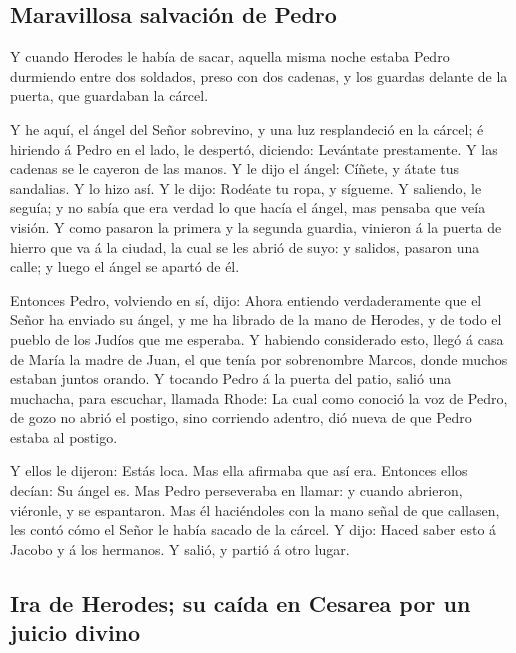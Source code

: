 \hypertarget{maravillosa-salvaciuxf3n-de-pedro}{%
\subsection{Maravillosa salvación de
Pedro}\label{maravillosa-salvaciuxf3n-de-pedro}}

 Y cuando Herodes le había de sacar, aquella misma noche
estaba Pedro durmiendo entre dos soldados, preso con dos cadenas, y los
guardas delante de la puerta, que guardaban la cárcel.

 Y he aquí, el ángel del Señor sobrevino, y una luz
resplandeció en la cárcel; é hiriendo á Pedro en el lado, le despertó,
diciendo: Levántate prestamente. Y las cadenas se le cayeron de las
manos.  Y le dijo el ángel: Cíñete, y átate tus sandalias.
Y lo hizo así. Y le dijo: Rodéate tu ropa, y sígueme.  Y
saliendo, le seguía; y no sabía que era verdad lo que hacía el ángel,
mas pensaba que veía visión.  Y como pasaron la primera y
la segunda guardia, vinieron á la puerta de hierro que va á la ciudad,
la cual se les abrió de suyo: y salidos, pasaron una calle; y luego el
ángel se apartó de él.

 Entonces Pedro, volviendo en sí, dijo: Ahora entiendo
verdaderamente que el Señor ha enviado su ángel, y me ha librado de la
mano de Herodes, y de todo el pueblo de los Judíos que me esperaba.
 Y habiendo considerado esto, llegó á casa de María la
madre de Juan, el que tenía por sobrenombre Marcos, donde muchos estaban
juntos orando.  Y tocando Pedro á la puerta del patio,
salió una muchacha, para escuchar, llamada Rhode:  La
cual como conoció la voz de Pedro, de gozo no abrió el postigo, sino
corriendo adentro, dió nueva de que Pedro estaba al postigo.

 Y ellos le dijeron: Estás loca. Mas ella afirmaba que
así era. Entonces ellos decían: Su ángel es.  Mas Pedro
perseveraba en llamar: y cuando abrieron, viéronle, y se espantaron.
 Mas él haciéndoles con la mano señal de que callasen,
les contó cómo el Señor le había sacado de la cárcel. Y dijo: Haced
saber esto á Jacobo y á los hermanos. Y salió, y partió á otro lugar.

\hypertarget{ira-de-herodes-su-cauxedda-en-cesarea-por-un-juicio-divino}{%
\subsection{Ira de Herodes; su caída en Cesarea por un juicio
divino}\label{ira-de-herodes-su-cauxedda-en-cesarea-por-un-juicio-divino}}

